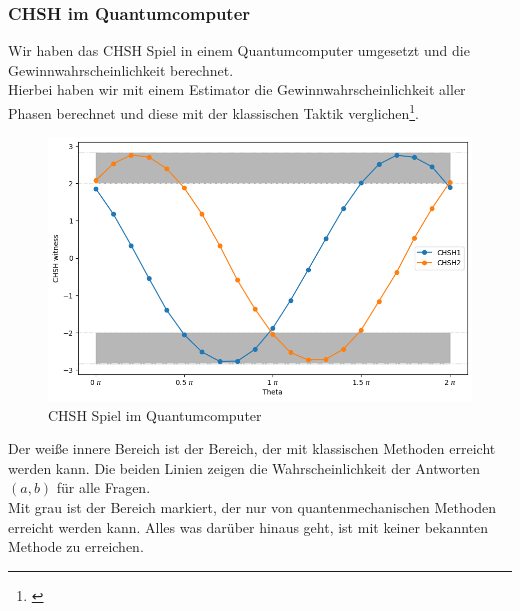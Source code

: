 \subsubsection{CHSH im Quantumcomputer}
\label{subsubsec:chsh_quantumcomputer}
Wir haben das CHSH Spiel in einem Quantumcomputer umgesetzt und die Gewinnwahrscheinlichkeit berechnet.\\
Hierbei haben wir mit einem Estimator die Gewinnwahrscheinlichkeit aller Phasen berechnet und diese mit der klassischen Taktik verglichen\footnote{\cite{IBM_chsh_2025}}.

\begin{figure}[H]
    \centering
    \includegraphics[width=0.8\linewidth]{img/CHSH-Output.png}
    \caption{CHSH Spiel im Quantumcomputer}
    \label{fig:CHSHQuantum}
\end{figure}

Der weiße innere Bereich ist der Bereich, der mit klassischen Methoden erreicht werden kann.
Die beiden Linien zeigen die Wahrscheinlichkeit der Antworten $(a, b)$ für alle Fragen.\\
Mit grau ist der Bereich markiert, der nur von quantenmechanischen Methoden erreicht werden kann. Alles was darüber hinaus geht, ist mit keiner bekannten Methode zu erreichen.\\
